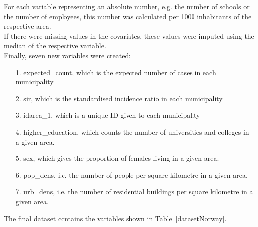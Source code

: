 For each variable representing an absolute number, e.g. the number of schools or the number of employees, this number was calculated per 1000 inhabitants of the respective area. \\
If there were missing values in the covariates, these values were imputed using the median of the respective variable. \\
Finally, seven new variables were created:
\begin{itemize}
    \item[1.] expected\_count, which is the expected number of cases in each municipality
    \item[2.] sir, which is the standardised incidence ratio in each municipality
    \item[3.] idarea\_1, which is a unique ID given to each municipality
    \item[4.] higher\_education, which counts the number of universities and colleges in a given area.
    \item[5.] sex, which gives the proportion of females living in a given area.
    \item[6.] pop\_dens, i.e. the number of people per square kilometre in a given area.
    \item[7.] urb\_dens, i.e. the number of residential buildings per square kilometre in a given area.
\end{itemize}
The final dataset contains the variables shown in Table~\ref{datasetNorway}.
